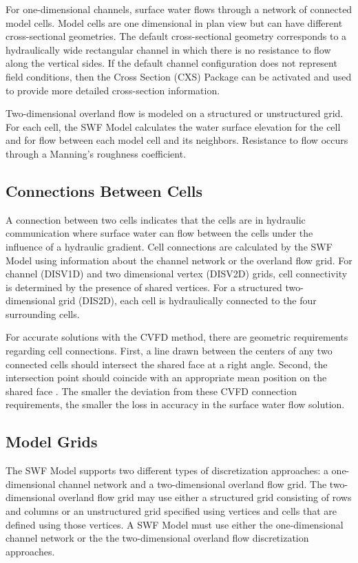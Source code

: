 \documentclass[fleqn]{article}
\begin{document}
For one-dimensional channels, surface water flows through a network of connected model cells.  Model cells are one dimensional in plan view but can have different cross-sectional geometries.  The default cross-sectional geometry corresponds to a hydraulically wide rectangular channel in which there is no resistance to flow along the vertical sides.  If the default channel configuration does not represent field conditions, then the Cross Section (CXS) Package can be activated and used to provide more detailed cross-section information.

Two-dimensional overland flow is modeled on a structured or unstructured grid.  For each cell, the SWF Model calculates the water surface elevation for the cell and for flow between each model cell and its neighbors.  Resistance to flow occurs through a Manning's roughness coefficient.

\subsection{Connections Between Cells}
A connection between two cells indicates that the cells are in hydraulic communication where surface water can flow between the cells under the influence of a hydraulic gradient.  Cell connections are calculated by the SWF Model using information about the channel network or the overland flow grid.  For channel (DISV1D) and two dimensional vertex (DISV2D) grids, cell connectivity is determined by the presence of shared vertices.  For a structured two-dimensional grid (DIS2D), each cell is hydraulically connected to the four surrounding cells.  

For accurate solutions with the CVFD method, there are geometric requirements regarding cell connections.  First, a line drawn between the centers of any two connected cells should intersect the shared face at a right angle. Second, the intersection point should coincide with an appropriate mean position on the shared face \cite{narasimhan1976integrated}.  The smaller the deviation from these CVFD connection requirements, the smaller the loss in accuracy in the surface water flow solution. 

\subsection{Model Grids}
The SWF Model supports two different types of discretization approaches: a one-dimensional channel network and a two-dimensional overland flow grid.  The two-dimensional overland flow grid may use either a structured grid consisting of rows and columns or an unstructured grid specified using vertices and cells that are defined using those vertices.  A SWF Model must use either the one-dimensional channel network or the the two-dimensional overland flow discretization approaches.  
\end{document}
